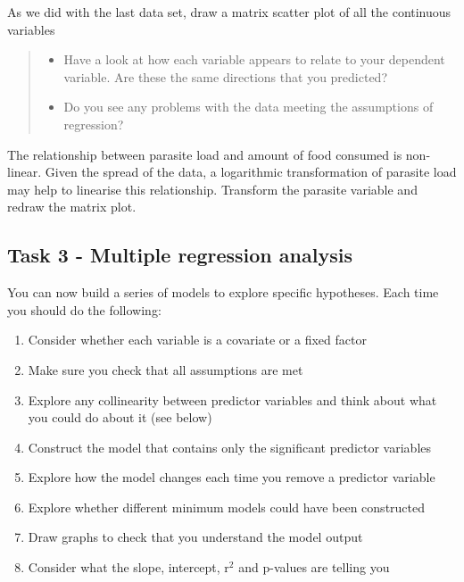 \documentclass[
]{book}
\providecommand{\tightlist}{%
  \setlength{\itemsep}{0pt}\setlength{\parskip}{0pt}}
\begin{document}
As we did with the last data set, draw a matrix scatter plot of all the continuous variables

\begin{quote}
\begin{itemize}
\tightlist
\item
  Have a look at how each variable appears to relate to your dependent variable. Are these the same directions that you predicted?
\item
  Do you see any problems with the data meeting the assumptions of regression?
\end{itemize}
\end{quote}

The relationship between parasite load and amount of food consumed is non-linear. Given the spread of the data, a logarithmic transformation of parasite load may help to linearise this relationship. Transform the parasite variable and redraw the matrix plot.

\hypertarget{task-3---multiple-regression-analysis}{%
\subsection{Task 3 - Multiple regression analysis}\label{task-3---multiple-regression-analysis}}

You can now build a series of models to explore specific hypotheses. Each time you should do the following:

\begin{enumerate}
\def\labelenumi{\arabic{enumi})}
\tightlist
\item
  Consider whether each variable is a covariate or a fixed factor
\item
  Make sure you check that all assumptions are met
\item
  Explore any collinearity between predictor variables and think about what you could do about it (see below)
\item
  Construct the model that contains only the significant predictor variables
\item
  Explore how the model changes each time you remove a predictor variable
\item
  Explore whether different minimum models could have been constructed
\item
  Draw graphs to check that you understand the model output
\item
  Consider what the slope, intercept, r\(^2\) and p-values are telling you
\end{enumerate}
\end{document}
